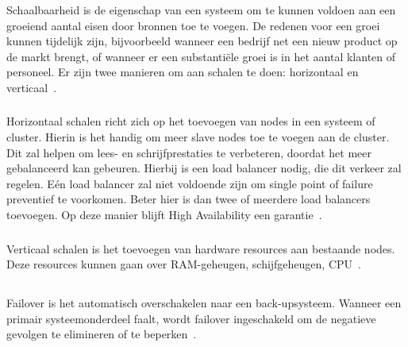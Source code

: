 Schaalbaarheid is de eigenschap van een systeem om te kunnen voldoen aan een groeiend aantal eisen door bronnen toe te voegen. De redenen voor een groei kunnen tijdelijk zijn, bijvoorbeeld wanneer een bedrijf net een nieuw product op de markt brengt, of wanneer er een substantiële groei is in het aantal klanten of personeel. Er zijn twee manieren om aan schalen te doen: horizontaal en verticaal~\autocite{Insausti2019}.

\subsubsection{}
\label{subsubsec:Horizontaal schalen}
Horizontaal schalen richt zich op het toevoegen van nodes in een systeem of cluster. Hierin is het handig om meer slave nodes toe te voegen aan de cluster. Dit zal helpen om lees- en schrijfprestaties te verbeteren, doordat het meer gebalanceerd kan gebeuren. Hierbij is een load balancer nodig, die dit verkeer zal regelen. Eén load balancer zal niet voldoende zijn om single point of failure preventief te voorkomen. Beter hier is dan twee of meerdere load balancers toevoegen. Op deze manier blijft High Availability een garantie~\autocite{Insausti2019}.

\subsubsection{}
\label{subsubsec:Verticaal schalen}
Verticaal schalen is het toevoegen van hardware resources aan bestaande nodes. Deze resources kunnen gaan over RAM-geheugen, schijfgeheugen, CPU~\autocite{Insausti2019}.

\subsection{}
\label{subsec:Failover}

Failover is het automatisch overschakelen naar een back-upsysteem. Wanneer een primair systeemonderdeel faalt, wordt failover ingeschakeld om de negatieve gevolgen te elimineren of te beperken~\autocite{AVINetworks2020}.

\subsection{}
\label{subsec:Failback}

